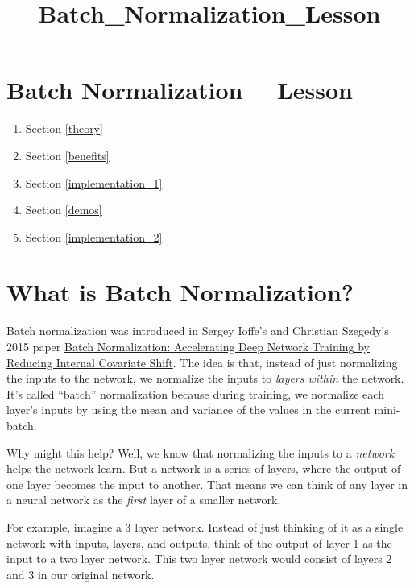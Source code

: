 \documentclass[11pt]{article}
\title{Batch\_Normalization\_Lesson}
\providecommand{\tightlist}{%
      \setlength{\itemsep}{0pt}\setlength{\parskip}{0pt}}
\begin{document}
    
    
    \maketitle
    
    

    
    \hypertarget{batch-normalization-lesson}{%
\section{Batch Normalization
--~Lesson}\label{batch-normalization-lesson}}

\begin{enumerate}
\def\labelenumi{\arabic{enumi}.}
\tightlist
\item
  Section \ref{theory}
\item
  Section \ref{benefits}
\item
  Section \ref{implementation_1}
\item
  Section \ref{demos}
\item
  Section \ref{implementation_2}
\end{enumerate}

\hypertarget{what-is-batch-normalization}{%
\section{What is Batch
Normalization?}\label{what-is-batch-normalization}}

Batch normalization was introduced in Sergey Ioffe's and Christian
Szegedy's 2015 paper \href{https://arxiv.org/pdf/1502.03167.pdf}{Batch
Normalization: Accelerating Deep Network Training by Reducing Internal
Covariate Shift}. The idea is that, instead of just normalizing the
inputs to the network, we normalize the inputs to \emph{layers within}
the network. It's called ``batch'' normalization because during
training, we normalize each layer's inputs by using the mean and
variance of the values in the current mini-batch.

Why might this help? Well, we know that normalizing the inputs to a
\emph{network} helps the network learn. But a network is a series of
layers, where the output of one layer becomes the input to another. That
means we can think of any layer in a neural network as the \emph{first}
layer of a smaller network.

For example, imagine a 3 layer network. Instead of just thinking of it
as a single network with inputs, layers, and outputs, think of the
output of layer 1 as the input to a two layer network. This two layer
network would consist of layers 2 and 3 in our original network.
\end{document}
